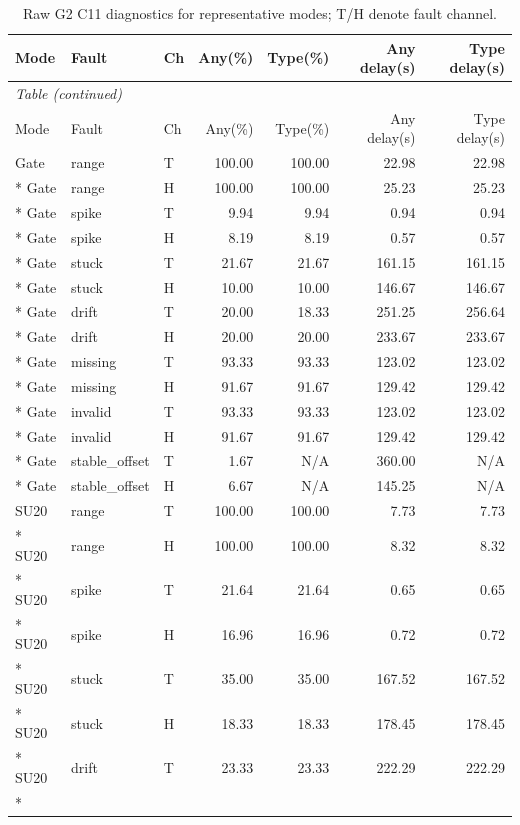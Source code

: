 \begin{small}\setlength{\tabcolsep}{4pt}\begin{longtable}{lllrrrr}\caption{Raw G2 C11 diagnostics for representative modes; T/H denote fault channel.}\label{tab:transferhealth}\\\toprule Mode & Fault & Ch & Any(\%) & Type(\%) & Any delay(s) & Type delay(s) \\\midrule\endfirsthead\multicolumn{7}{l}{\textit{Table \thetable{} (continued)}}\\\toprule Mode & Fault & Ch & Any(\%) & Type(\%) & Any delay(s) & Type delay(s) \\\midrule\endhead
Gate & range & T & 100.00 & 100.00 & 22.98 & 22.98 \\*
Gate & range & H & 100.00 & 100.00 & 25.23 & 25.23 \\*
Gate & spike & T & 9.94 & 9.94 & 0.94 & 0.94 \\*
Gate & spike & H & 8.19 & 8.19 & 0.57 & 0.57 \\*
Gate & stuck & T & 21.67 & 21.67 & 161.15 & 161.15 \\*
Gate & stuck & H & 10.00 & 10.00 & 146.67 & 146.67 \\*
Gate & drift & T & 20.00 & 18.33 & 251.25 & 256.64 \\*
Gate & drift & H & 20.00 & 20.00 & 233.67 & 233.67 \\*
Gate & missing & T & 93.33 & 93.33 & 123.02 & 123.02 \\*
Gate & missing & H & 91.67 & 91.67 & 129.42 & 129.42 \\*
Gate & invalid & T & 93.33 & 93.33 & 123.02 & 123.02 \\*
Gate & invalid & H & 91.67 & 91.67 & 129.42 & 129.42 \\*
Gate & stable\_offset & T & 1.67 & N/A & 360.00 & N/A \\*
Gate & stable\_offset & H & 6.67 & N/A & 145.25 & N/A \\
SU20 & range & T & 100.00 & 100.00 & 7.73 & 7.73 \\*
SU20 & range & H & 100.00 & 100.00 & 8.32 & 8.32 \\*
SU20 & spike & T & 21.64 & 21.64 & 0.65 & 0.65 \\*
SU20 & spike & H & 16.96 & 16.96 & 0.72 & 0.72 \\*
SU20 & stuck & T & 35.00 & 35.00 & 167.52 & 167.52 \\*
SU20 & stuck & H & 18.33 & 18.33 & 178.45 & 178.45 \\*
SU20 & drift & T & 23.33 & 23.33 & 222.29 & 222.29 \\*

\end{longtable}
\end{small}
